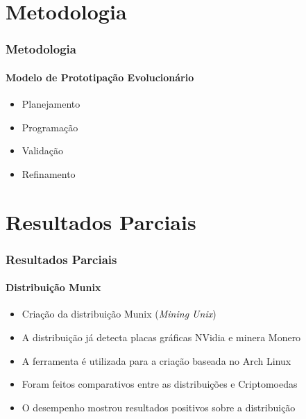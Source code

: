 \documentclass[aspectratio=43]{beamer}
\begin{document}
\section{Metodologia}
\begin{frame}
    \frametitle{Metodologia}
    \framesubtitle{Modelo de Prototipação Evolucionário}

    \begin{itemize}
        \item Planejamento

        \item Programação

        \item Validação

        \item Refinamento

    \end{itemize}
\end{frame}

\section{Resultados Parciais}

\begin{frame}
    \frametitle{Resultados Parciais}
    \framesubtitle{Distribuição Munix}

    \begin{itemize}
        \item Criação da distribuição Munix (\emph{Mining Unix}) 

        \item A distribuição já detecta placas gráficas NVidia e
            minera Monero

        \item A ferramenta  é utilizada para a criação
            baseada no Arch Linux

        \item Foram feitos comparativos entre as distribuições e
            Criptomoedas
            
        \item O desempenho mostrou resultados positivos sobre a
            distribuição

    \end{itemize}
\end{frame}


\end{document}
